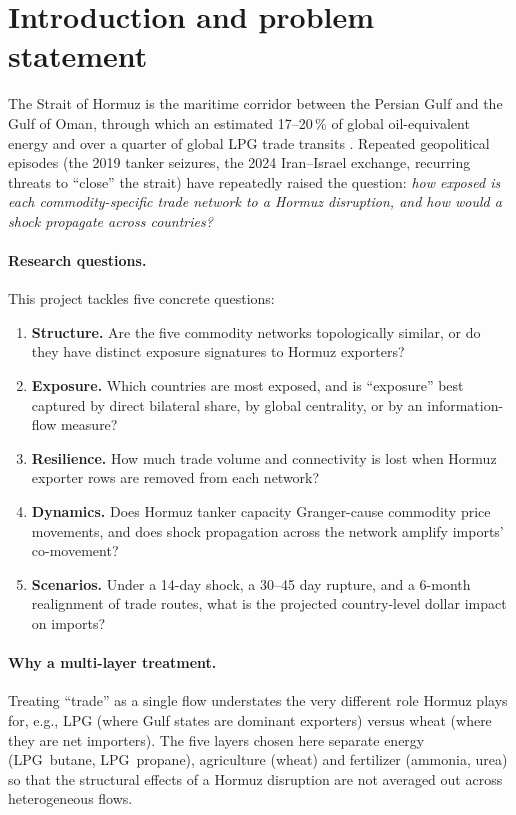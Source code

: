 \documentclass[11pt,a4paper]{article}
\begin{document}
\section{Introduction and problem statement}

The Strait of Hormuz is the maritime corridor between the Persian Gulf
and the Gulf of Oman, through which an estimated 17--20\,\% of global
oil-equivalent energy and over a quarter of global LPG trade transits
\citep{eia_hormuz}. Repeated geopolitical episodes (the 2019 tanker
seizures, the 2024 Iran--Israel exchange, recurring threats to ``close''
the strait) have repeatedly raised the question: \emph{how exposed is
each commodity-specific trade network to a Hormuz disruption, and how
would a shock propagate across countries?}

\paragraph{Research questions.} This project tackles five concrete
questions:
\begin{enumerate}[leftmargin=2em, itemsep=0.1em]
  \item \textbf{Structure.} Are the five commodity networks
        topologically similar, or do they have distinct exposure
        signatures to Hormuz exporters?
  \item \textbf{Exposure.} Which countries are most exposed, and is
        ``exposure'' best captured by direct bilateral share, by
        global centrality, or by an information-flow measure?
  \item \textbf{Resilience.} How much trade volume and connectivity is
        lost when Hormuz exporter rows are removed from each network?
  \item \textbf{Dynamics.} Does Hormuz tanker capacity Granger-cause
        commodity price movements, and does shock propagation across
        the network amplify imports' co-movement?
  \item \textbf{Scenarios.} Under a 14-day shock, a 30--45 day
        rupture, and a 6-month realignment of trade routes, what is
        the projected country-level dollar impact on imports?
\end{enumerate}

\paragraph{Why a multi-layer treatment.} Treating ``trade'' as a single
flow understates the very different role Hormuz plays for, e.g.,
LPG (where Gulf states are dominant exporters) versus wheat (where they
are net importers). The five layers chosen here separate energy
(LPG~butane, LPG~propane), agriculture (wheat) and fertilizer
(ammonia, urea) so that the structural effects of a Hormuz disruption
are not averaged out across heterogeneous flows.
\end{document}
